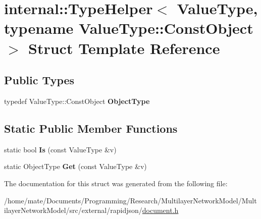\hypertarget{structinternal_1_1TypeHelper_3_01ValueType_00_01typename_01ValueType_1_1ConstObject_01_4}{}\section{internal\+:\+:Type\+Helper$<$ Value\+Type, typename Value\+Type\+:\+:Const\+Object $>$ Struct Template Reference}
\label{structinternal_1_1TypeHelper_3_01ValueType_00_01typename_01ValueType_1_1ConstObject_01_4}
\subsection*{Public Types}
\begin{DoxyCompactItemize}
\item 
typedef Value\+Type\+::\+Const\+Object {\bfseries Object\+Type}\hypertarget{structinternal_1_1TypeHelper_3_01ValueType_00_01typename_01ValueType_1_1ConstObject_01_4_a986df6ac09ceb6cc9ba9fd4d73e90495}{}\label{structinternal_1_1TypeHelper_3_01ValueType_00_01typename_01ValueType_1_1ConstObject_01_4_a986df6ac09ceb6cc9ba9fd4d73e90495}

\end{DoxyCompactItemize}
\subsection*{Static Public Member Functions}
\begin{DoxyCompactItemize}
\item 
static bool {\bfseries Is} (const Value\+Type \&v)\hypertarget{structinternal_1_1TypeHelper_3_01ValueType_00_01typename_01ValueType_1_1ConstObject_01_4_a843e707732c55f2178d399a0af13605a}{}\label{structinternal_1_1TypeHelper_3_01ValueType_00_01typename_01ValueType_1_1ConstObject_01_4_a843e707732c55f2178d399a0af13605a}

\item 
static Object\+Type {\bfseries Get} (const Value\+Type \&v)\hypertarget{structinternal_1_1TypeHelper_3_01ValueType_00_01typename_01ValueType_1_1ConstObject_01_4_ae6a797157c9b3d15ca4a32c48ea4bc73}{}\label{structinternal_1_1TypeHelper_3_01ValueType_00_01typename_01ValueType_1_1ConstObject_01_4_ae6a797157c9b3d15ca4a32c48ea4bc73}

\end{DoxyCompactItemize}


The documentation for this struct was generated from the following file\+:\begin{DoxyCompactItemize}
\item 
/home/mate/\+Documents/\+Programming/\+Research/\+Multilayer\+Network\+Model/\+Multilayer\+Network\+Model/src/external/rapidjson/\hyperlink{document_8h}{document.\+h}\end{DoxyCompactItemize}
